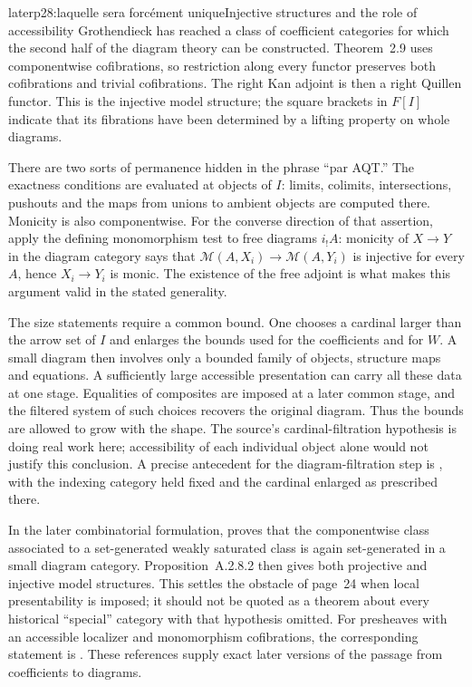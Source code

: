 \begin{dcomment}{later}{p28:laquelle sera forcément unique}{Injective structures and the role of accessibility}
Grothendieck has reached a class of coefficient categories for which the second half of the diagram theory can be constructed. Theorem~2.9 uses componentwise cofibrations, so restriction along every functor preserves both cofibrations and trivial cofibrations. The right Kan adjoint is then a right Quillen functor. This is the injective model structure; the square brackets in $F[I]$ indicate that its fibrations have been determined by a lifting property on whole diagrams.

There are two sorts of permanence hidden in the phrase ``par AQT.'' The exactness conditions are evaluated at objects of $I$: limits, colimits, intersections, pushouts and the maps from unions to ambient objects are computed there. Monicity is also componentwise. For the converse direction of that assertion, apply the defining monomorphism test to free diagrams $i_!A$: monicity of $X\to Y$ in the diagram category says that $\mathcal M(A,X_i)\to\mathcal M(A,Y_i)$ is injective for every $A$, hence $X_i\to Y_i$ is monic. The existence of the free adjoint is what makes this argument valid in the stated generality.

The size statements require a common bound. One chooses a cardinal larger than the arrow set of $I$ and enlarges the bounds used for the coefficients and for $W$. A small diagram then involves only a bounded family of objects, structure maps and equations. A sufficiently large accessible presentation can carry all these data at one stage. Equalities of composites are imposed at a later common stage, and the filtered system of such choices recovers the original diagram. Thus the bounds are allowed to grow with the shape. The source's cardinal-filtration hypothesis is doing real work here; accessibility of each individual object alone would not justify this conclusion. A precise antecedent for the diagram-filtration step is \citet[Exposé~I, Corollary~9.24]{SGA4I1972}, with the indexing category held fixed and the cardinal enlarged as prescribed there.

In the later combinatorial formulation, \citet[Lemma~A.2.8.3]{Lurie2009HTT} proves that the componentwise class associated to a set-generated weakly saturated class is again set-generated in a small diagram category. Proposition~A.2.8.2 then gives both projective and injective model structures. This settles the obstacle of page~24 when local presentability is imposed; it should not be quoted as a theorem about every historical ``special'' category with that hypothesis omitted. For presheaves with an accessible localizer and monomorphism cofibrations, the corresponding statement is \citet[Corollary~1.4.22]{Cisinski2006}. These references supply exact later versions of the passage from coefficients to diagrams.


\end{dcomment}
